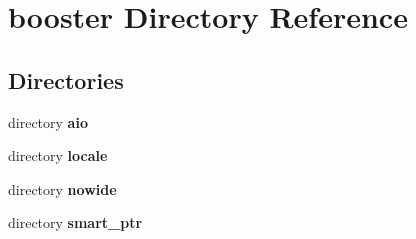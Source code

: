 \section{booster Directory Reference}
\label{dir_84328363ceaa5686f2cc6e88d283e19a}
\subsection*{Directories}
\begin{DoxyCompactItemize}
\item 
directory {\bf aio}
\item 
directory {\bf locale}
\item 
directory {\bf nowide}
\item 
directory {\bf smart\-\_\-ptr}
\end{DoxyCompactItemize}
